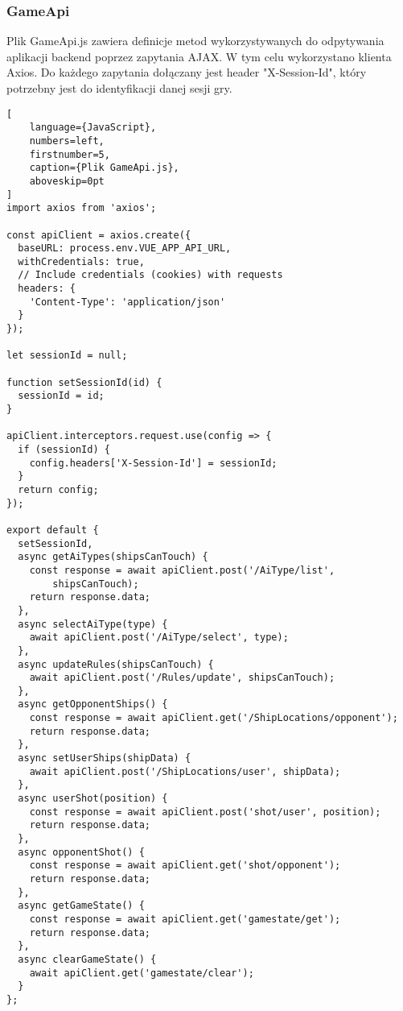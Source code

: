 \subsubsection{GameApi}
Plik GameApi.js zawiera definicje metod wykorzystywanych do odpytywania aplikacji backend poprzez zapytania AJAX. W tym celu wykorzystano klienta Axios. Do każdego zapytania dołączany jest header "X-Session-Id", który potrzebny jest do identyfikacji danej sesji gry.

\begin{addmargin}[0mm]{0mm}
\begin{lstlisting}[
    language={JavaScript},
    numbers=left,
    firstnumber=5,
    caption={Plik GameApi.js},
    aboveskip=0pt
]
import axios from 'axios';

const apiClient = axios.create({
  baseURL: process.env.VUE_APP_API_URL,
  withCredentials: true,
  // Include credentials (cookies) with requests
  headers: {
    'Content-Type': 'application/json'
  }
});

let sessionId = null;

function setSessionId(id) {
  sessionId = id;
}

apiClient.interceptors.request.use(config => {
  if (sessionId) {
    config.headers['X-Session-Id'] = sessionId;
  }
  return config;
});

export default {
  setSessionId,
  async getAiTypes(shipsCanTouch) {
    const response = await apiClient.post('/AiType/list',
        shipsCanTouch);
    return response.data;
  },
  async selectAiType(type) {
    await apiClient.post('/AiType/select', type);
  },
  async updateRules(shipsCanTouch) {
    await apiClient.post('/Rules/update', shipsCanTouch);
  },
  async getOpponentShips() {
    const response = await apiClient.get('/ShipLocations/opponent');
    return response.data;
  },
  async setUserShips(shipData) {
    await apiClient.post('/ShipLocations/user', shipData);
  },
  async userShot(position) {
    const response = await apiClient.post('shot/user', position);
    return response.data;
  },
  async opponentShot() {
    const response = await apiClient.get('shot/opponent');
    return response.data;
  },
  async getGameState() {
    const response = await apiClient.get('gamestate/get');
    return response.data;
  },
  async clearGameState() {
    await apiClient.get('gamestate/clear');
  }
};

\end{lstlisting}
\end{addmargin}

